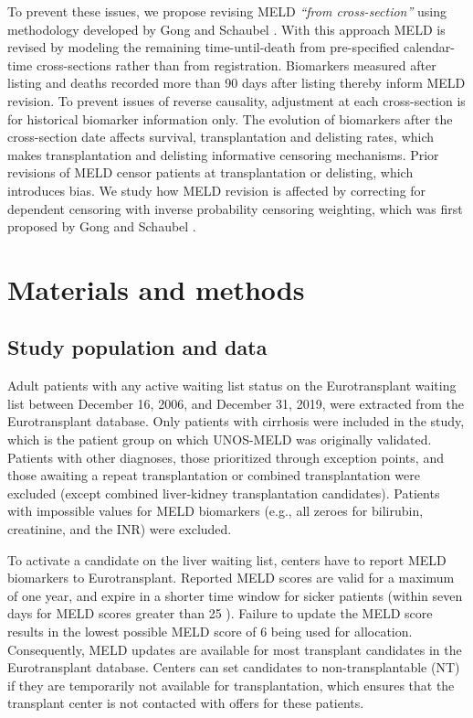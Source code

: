 \documentclass[11pt,twoside,]{book}
\begin{document}
To prevent these issues, we propose revising MELD \emph{``from cross-section''}
using methodology developed by Gong and Schaubel
\citep{gongPartlyConditionalEstimation2013}. With this approach MELD is
revised by modeling the remaining time-until-death from pre-specified
calendar-time cross-sections rather than from registration. Biomarkers
measured after listing and deaths recorded more than 90
days after listing thereby inform MELD revision. To prevent issues of reverse
causality, adjustment at each cross-section is for historical biomarker
information only. The evolution of biomarkers after the cross-section
date affects survival, transplantation and delisting rates, which makes
transplantation and delisting informative censoring mechanisms. Prior revisions
of MELD censor patients at transplantation or delisting, which introduces
bias. We study how MELD revision is
affected by correcting for dependent censoring with inverse
probability censoring weighting, which was first proposed by Gong and Schaubel \citep{gongPartlyConditionalEstimation2013}.

\section{Materials and methods}\label{materials-and-methods}

\subsection{Study population and data}\label{study-population-and-data}

Adult patients with any active waiting list status on the Eurotransplant
waiting list between December 16, 2006, and December 31, 2019, were extracted from
the Eurotransplant database. Only patients with cirrhosis were included
in the study, which is the patient group on which UNOS-MELD was originally
validated. Patients with other diagnoses, those prioritized through exception
points, and those awaiting a repeat transplantation or combined transplantation
were excluded (except combined liver-kidney transplantation
candidates). Patients with impossible values for MELD biomarkers (e.g., all
zeroes for bilirubin, creatinine, and the INR) were excluded.

To activate a candidate on the liver waiting list, centers have to report MELD
biomarkers to Eurotransplant. Reported MELD scores are valid for a maximum of one
year, and expire in a shorter time window for sicker patients (within seven days for MELD scores greater than 25
\citep{ETLiverMan2025}). Failure to update the MELD score results in the
lowest possible MELD score of 6 being used for allocation. Consequently,
MELD updates are available for most transplant candidates in the Eurotransplant
database. Centers can set
candidates to non-transplantable (NT) if they are temporarily not available
for transplantation, which ensures that the transplant center is not
contacted with offers for these patients.
\end{document}
